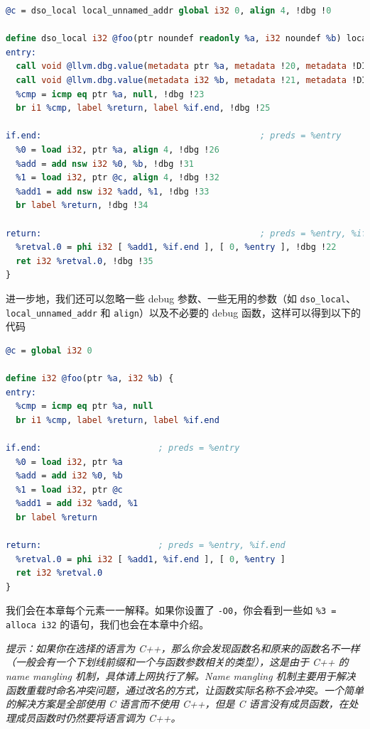 \begin{lstlisting}[language=llvm]
@c = dso_local local_unnamed_addr global i32 0, align 4, !dbg !0

define dso_local i32 @foo(ptr noundef readonly %a, i32 noundef %b) local_unnamed_addr #0 !dbg !15 {
entry:
  call void @llvm.dbg.value(metadata ptr %a, metadata !20, metadata !DIExpression()), !dbg !22
  call void @llvm.dbg.value(metadata i32 %b, metadata !21, metadata !DIExpression()), !dbg !22
  %cmp = icmp eq ptr %a, null, !dbg !23
  br i1 %cmp, label %return, label %if.end, !dbg !25

if.end:                                           ; preds = %entry
  %0 = load i32, ptr %a, align 4, !dbg !26
  %add = add nsw i32 %0, %b, !dbg !31
  %1 = load i32, ptr @c, align 4, !dbg !32
  %add1 = add nsw i32 %add, %1, !dbg !33
  br label %return, !dbg !34

return:                                           ; preds = %entry, %if.end
  %retval.0 = phi i32 [ %add1, %if.end ], [ 0, %entry ], !dbg !22
  ret i32 %retval.0, !dbg !35
}
\end{lstlisting}

进一步地，我们还可以忽略一些 debug 参数、一些无用的参数（如
\texttt{dso\_local}、\texttt{local\_unnamed\_addr} 和
\texttt{align}）以及不必要的 debug 函数，这样可以得到以下的代码

\begin{lstlisting}[language=llvm]
@c = global i32 0

define i32 @foo(ptr %a, i32 %b) {
entry:
  %cmp = icmp eq ptr %a, null
  br i1 %cmp, label %return, label %if.end

if.end:                       ; preds = %entry
  %0 = load i32, ptr %a
  %add = add i32 %0, %b
  %1 = load i32, ptr @c
  %add1 = add i32 %add, %1
  br label %return

return:                       ; preds = %entry, %if.end
  %retval.0 = phi i32 [ %add1, %if.end ], [ 0, %entry ]
  ret i32 %retval.0
}
\end{lstlisting}

我们会在本章每个元素一一解释。如果你设置了 \texttt{-O0}，你会看到一些如
\texttt{\%3 = alloca i32} 的语句，我们也会在本章中介绍。

\textit{提示：如果你在选择的语言为 C++，那么你会发现函数名和原来的函数名不一样（一般会有一个下划线前缀和一个与函数参数相关的类型），这是由于
C++ 的 name mangling 机制，具体请上网执行了解。Name mangling
 机制主要用于解决函数重载时命名冲突问题，通过改名的方式，让函数实际名称不会冲突。一个简单的解决方案是全部使用
 C 语言而不使用 C++，但是 C 语言没有成员函数，在处理成员函数时仍然要将语言调为 C++。}

